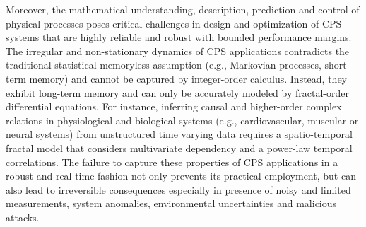 Moreover, the mathematical understanding, description, prediction and control of physical processes poses critical challenges in design and optimization of CPS systems that are highly reliable and robust with bounded performance margins. The irregular and non-stationary dynamics of CPS applications contradicts the traditional statistical memoryless assumption (e.g., Markovian processes, short-term memory) and cannot be captured by integer-order calculus. Instead, they exhibit long-term memory and can only be accurately modeled by fractal-order differential equations. For instance, inferring causal and higher-order complex relations in physiological and biological systems (e.g., cardiovascular, muscular or neural systems) from unstructured time varying data requires a spatio-temporal fractal model that considers multivariate dependency and a power-law temporal correlations. The failure to capture these properties of CPS applications in a robust and real-time fashion not only prevents its practical employment, but can also lead to irreversible consequences especially in presence of noisy and limited measurements, system anomalies, environmental uncertainties and malicious attacks. 

